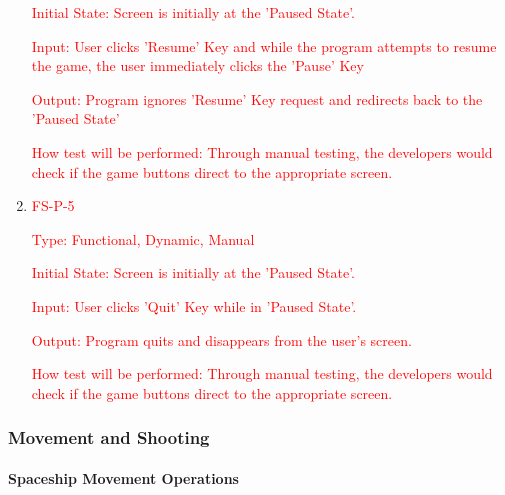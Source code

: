 \documentclass[12pt, titlepage]{article}
\begin{document}
\begin{enumerate}
\textcolor{red}{Initial State: Screen is initially at the 'Paused State'.}
					
\textcolor{red}{Input: User clicks 'Resume' Key and while the program attempts to resume the game, the user immediately clicks the 'Pause' Key}
					
\textcolor{red}{Output: Program ignores 'Resume' Key request and redirects back to the 'Paused State'}

\textcolor{red}{How test will be performed: Through manual testing, the developers would check if the game buttons direct to the appropriate screen.}

\item\textcolor{red}{FS-P-5\\}

\textcolor{red}{Type: Functional, Dynamic, Manual}

\textcolor{red}{Initial State: Screen is initially at the 'Paused State'.}
					
\textcolor{red}{Input: User clicks 'Quit' Key while in 'Paused State'.}
					
\textcolor{red}{Output: Program quits and disappears from the user's screen.}

\textcolor{red}{How test will be performed: Through manual testing, the developers would check if the game buttons direct to the appropriate screen.}

\end{enumerate}

\subsubsection{Movement and Shooting}

\paragraph{Spaceship Movement Operations}
\end{document}
